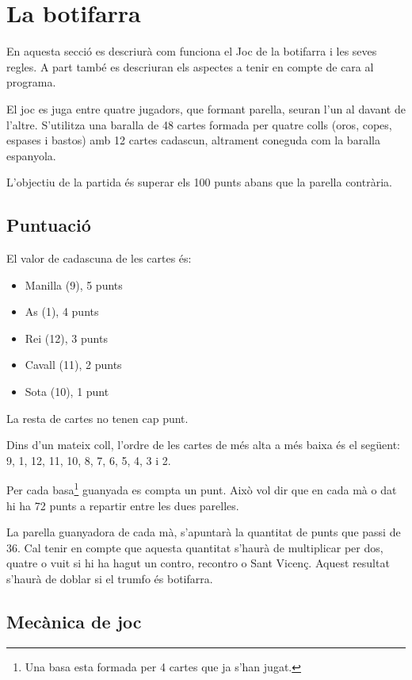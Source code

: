 \chapter{La botifarra}
\label{chap:botifarra}

En aquesta secció es descriurà com funciona el Joc de la botifarra i les seves regles. A part també es descriuran els aspectes a tenir en compte de cara al programa. 


El joc es juga entre quatre jugadors, que formant parella, seuran l'un al davant de l'altre. S'utilitza una baralla de 48 cartes formada per quatre colls (oros, copes, espases i bastos) amb 12 cartes cadascun, altrament coneguda com la baralla espanyola.


L'objectiu de la partida és superar els 100 punts abans que la parella contrària. 


\section{Puntuació}

El valor de cadascuna de les cartes és:
\begin{itemize}
	\item{Manilla (9), 5 punts}
    \item{As (1), 4 punts}
    \item{Rei (12), 3 punts}
    \item{Cavall (11), 2 punts}
    \item{Sota (10), 1 punt}
\end{itemize}

La resta de cartes no tenen cap punt.
    
Dins d'un mateix coll, l'ordre de les cartes de més alta a més baixa és el següent: 9, 1, 12, 11, 10, 8, 7, 6, 5, 4, 3 i 2.

Per cada basa\footnote{Una basa esta formada per 4 cartes que ja s'han jugat.} guanyada es compta un punt. Això vol dir que en cada mà o dat hi ha 72 punts a repartir entre les dues parelles.

La parella guanyadora de cada mà, s'apuntarà la quantitat de punts que passi de 36. Cal tenir en compte que aquesta quantitat s'haurà de multiplicar per dos, quatre o vuit si hi ha hagut un contro, recontro o Sant Vicenç. Aquest resultat s'haurà de doblar si el trumfo és botifarra.

\section{Mecànica de joc}

